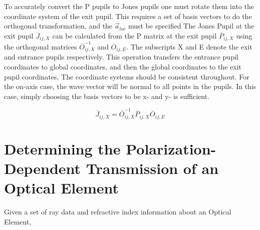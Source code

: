 \documentclass{article}
\begin{document}
	To accurately convert the P pupils to Jones pupils one must rotate them into the coordinate system of the exit pupil. This requires a set of basis vectors to do the orthogonal transformation, and the $\vec{a}_{loc}$ must be specified The Jones Pupil at the exit pupil $\overline{J}_{ij,X}$ can be calculated from the P matrix at the exit pupil $\overline{P}_{ij,X}$ using the orthogonal matrices $\overline{O}_{ij,X}^{-1}$ and $\overline{O}_{ij,E}$. The subscripts X and E denote the exit and entrance pupils respectively. This operation transfers the entrance pupil coordinates to global coordinates, and then the global coordinates to the exit pupil coordinates. The coordinate systems should be consistent throughout. For the on-axis case, the wave vector will be normal to all points in the pupils. In this case, simply choosing the basis vectors to be x- and y- is sufficient.
	
	\begin{equation}
		\overline{J}_{ij,X} = \overline{O}_{ij,X}^{-1} \overline{P}_{ij,X} \overline{O}_{ij,E}
	\end{equation}

	\section{Determining the Polarization-Dependent Transmission of an Optical Element}
	
	Given a set of ray data and refractive index information about an Optical Element, 
\end{document}
